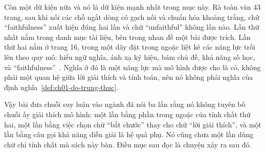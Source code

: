 %
Còn một dữ kiện nữa và nó là dữ kiện mạnh nhất trong mục này. Rà toàn văn 43
trang, sau khi nối các chỗ ngắt dòng có gạch nối và chuẩn hóa khoảng trắng, chữ
\enquote{faithfulness} xuất hiện đúng hai lần và chữ \enquote{unfaithful} không
lần nào. Lần thứ nhất nằm trong danh mục tài liệu, bên trong nhan đề một bài
được trích. Lần thứ hai nằm ở trang 16, trong một dãy đặt trong ngoặc liệt kê
các năng lực trồi lên theo quy mô: hiểu ngữ nghĩa, ánh xạ ký hiệu, bám chủ đề,
khả năng số học, và \enquote{faithfulness}~\autocite{p06cot}. Nghĩa ở đó là một năng lực mà
mô hình được cho là có, không phải một quan hệ giữa lời giải thích và tính toán,
nên nó không phải nghĩa của định nghĩa~\ref{def:ch01-do-trung-thuc}.

%
Vậy bài đưa chuỗi suy luận vào ngành đã nói ba lần rằng nó không tuyên bố chuỗi
ấy giải thích mô hình: một lần bằng phần trong ngoặc của tính chất thứ hai, một
lần bằng việc chọn chữ \enquote{bắt chước} thay cho chữ \enquote{lời giải
thích}, và một lần bằng câu gọi khả năng diễn giải là hệ quả phụ. Nó cũng chưa
một lần dùng chữ chỉ tính chất mà sách này bàn. Điều mục sau đọc là chuyện xảy ra
sau đó.
